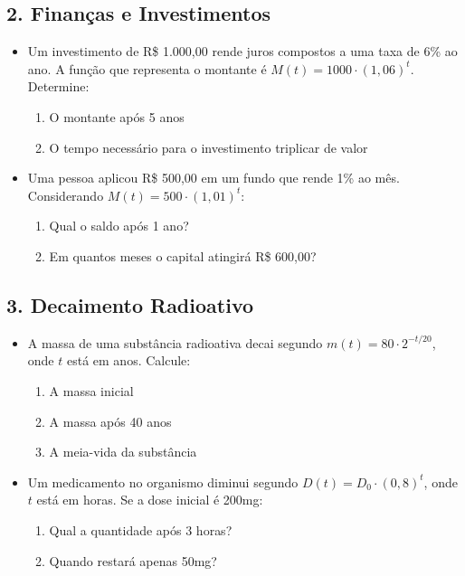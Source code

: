 \documentclass[11pt]{article}
\begin{document}
\begin{multicols}{2}
\begin{enumerate}
            \subsection*{2. Finanças e Investimentos}
            \begin{itemize}\setcounter{enumi}{2}
                \item Um investimento de R\$ 1.000,00 rende juros compostos a uma taxa de 6\% ao ano. A função que representa o montante é $M(t) = 1000 \cdot (1,06)^t$. Determine:
                    \begin{enumerate}[label=\alph*)]
                        \item O montante após 5 anos
                        \item O tempo necessário para o investimento triplicar de valor
                    \end{enumerate}

                \item Uma pessoa aplicou R\$ 500,00 em um fundo que rende 1\% ao mês. Considerando $M(t) = 500 \cdot (1,01)^t$:
                    \begin{enumerate}[label=\alph*)]
                        \item Qual o saldo após 1 ano?
                        \item Em quantos meses o capital atingirá R\$ 600,00?
                    \end{enumerate}
            \end{itemize}

            \subsection*{3. Decaimento Radioativo}
            \begin{itemize}\setcounter{enumi}{4}
                \item A massa de uma substância radioativa decai segundo $m(t) = 80 \cdot 2^{-t/20}$, onde $t$ está em anos. Calcule:
                    \begin{enumerate}[label=\alph*)]
                        \item A massa inicial
                        \item A massa após 40 anos
                        \item A meia-vida da substância
                    \end{enumerate}

                \item Um medicamento no organismo diminui segundo $D(t) = D_0 \cdot (0,8)^t$, onde $t$ está em horas. Se a dose inicial é 200mg:
                    \begin{enumerate}[label=\alph*)]
                        \item Qual a quantidade após 3 horas?
                        \item Quando restará apenas 50mg?
                    \end{enumerate}
            \end{itemize}


\end{enumerate}
\end{multicols}
\end{document}
